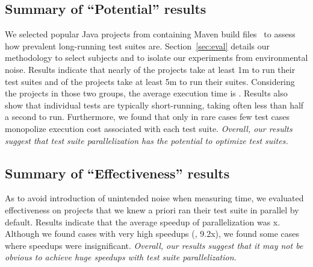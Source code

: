 


\subsection{Summary of ``Potential'' results}

We selected \numSubjs{} popular Java projects from \github{}
containing Maven build files~\cite{maven} to assess how prevalent
long-running test suites are.  Section~\ref{sec:eval} details our
methodology to select subjects and to isolate our experiments from
environmental noise.  Results indicate that nearly
\percentMedLongRunning{} of the projects take at least 1m to run their
test suites and \percentLongRunning{} of the projects take at least 5m
to run their suites.  Considering the \numMedLong{} projects in those
two groups, the average execution time is \averageMedLongRunning{}.
Results also show that individual tests are typically short-running,
taking often less than half a second to run.  Furthermore, we found
that only in rare cases few test cases monopolize execution cost
associated with each test suite.  \emph{Overall, our results suggest
  that test suite parallelization has the potential to optimize test
  suites.}

\subsection{Summary of ``Effectiveness'' results}

As to avoid introduction of unintended noise when measuring time, we
evaluated effectiveness on projects that we knew a priori ran their
test suite in parallel by default.  Results indicate that the average
speedup of parallelization was \avgSpeedup{}x.  Although we found
cases with very high speedups (\eg{}, 9.2x), we found some cases where
speedups were insignificant.  \emph{Overall, our results suggest that
  it may not be obvious to achieve huge speedups with test suite
  parallelization.}

